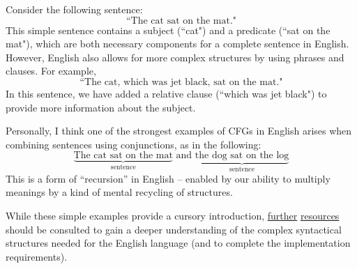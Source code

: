\documentclass{article}
\begin{document}
    \vspace{2mm}
    Consider the following sentence:$$\text{``The cat sat on the mat."}$$ This simple sentence contains a subject (``cat") and a predicate (``sat on the mat"), which are both necessary components for a complete sentence in English. However, English also allows for more complex structures by using phrases and clauses. For example, $$\text{``The cat, which was jet black, sat on the mat."}$$ In this sentence, we have added a relative clause (``which was jet black") to provide more information about the subject.
    
    Personally, I think one of the strongest examples of CFGs in English arises when combining sentences using conjunctions, as in the following: 
    $$\underbrace{\text{The cat sat on the mat}}_{\text{sentence}}\text{ and }\underbrace{\text{the dog sat on the log}}_{\text{sentence}}$$ 
    This is a form of “recursion” in English -- enabled by our ability to multiply meanings by a kind of mental recycling of structures.

    \vspace{2mm}
    While these simple examples provide a cursory introduction,  \href{http://www.cs.columbia.edu/~mcollins/cs4705-spring2020/slides/parsing1.pdf}{further} \href{http://faculty.washington.edu/cicero/370syntax.htm}{resources} should be consulted to gain a deeper understanding of the complex syntactical structures needed for the English language (and to complete the implementation requirements).
\end{document}
